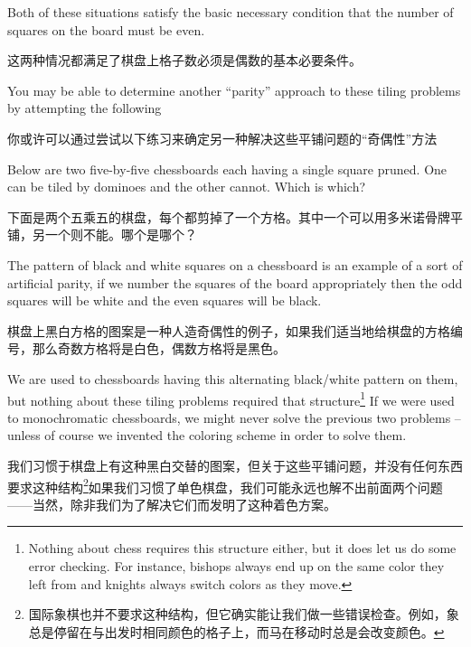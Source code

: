 Both of these situations satisfy the basic necessary condition that 
the number of squares on the board must be even.

这两种情况都满足了棋盘上格子数必须是偶数的基本必要条件。

You may be able
to determine another ``parity'' approach to these tiling problems
by attempting the following

你或许可以通过尝试以下练习来确定另一种解决这些平铺问题的“奇偶性”方法

\begin{exer}
Below are two five-by-five chessboards each having a single
square pruned. One can be tiled by dominoes and the other
cannot.  Which is which?
\begin{center}

\end{center}

\end{exer}

\begin{exer}
下面是两个五乘五的棋盘，每个都剪掉了一个方格。其中一个可以用多米诺骨牌平铺，另一个则不能。哪个是哪个？
\begin{center}

\end{center}
\end{exer}

The pattern of black and white squares on a chessboard is an 
example of a sort of artificial parity, if we number the squares
of the board appropriately then the odd squares will be white and
the even squares will be black.

棋盘上黑白方格的图案是一种人造奇偶性的例子，如果我们适当地给棋盘的方格编号，那么奇数方格将是白色，偶数方格将是黑色。

We are used to chessboards having
this alternating black/white pattern on them, but nothing about these
tiling problems required that structure\footnote{Nothing about chess
requires this structure either, but it does let us do some error checking. For instance, bishops always end up on the same color they left from and 
knights always switch colors as they move.}  If we were used to monochromatic chessboards, we might never solve the previous two problems -- unless
of course we invented the coloring scheme in order to solve them.

我们习惯于棋盘上有这种黑白交替的图案，但关于这些平铺问题，并没有任何东西要求这种结构\footnote{国际象棋也并不要求这种结构，但它确实能让我们做一些错误检查。例如，象总是停留在与出发时相同颜色的格子上，而马在移动时总是会改变颜色。}如果我们习惯了单色棋盘，我们可能永远也解不出前面两个问题——当然，除非我们为了解决它们而发明了这种着色方案。

